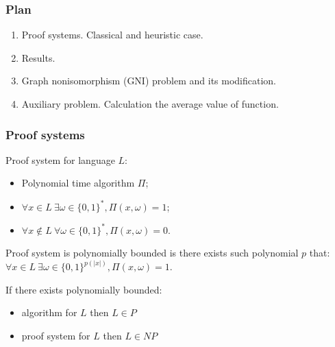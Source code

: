 \begin{frame}
    \frametitle{Plan}

    \begin{enumerate}
	    \item Proof systems. Classical and heuristic case.
    	\item Results.
    	\item Graph nonisomorphism (GNI) problem and its modification.
    	\item Auxiliary problem. Calculation the average value of function.
    \end{enumerate}
\end{frame}

\begin{frame}
	\frametitle{Proof systems}

    \begin{definition}
        Proof system for language $L$:
        \begin{itemize}
            \item Polynomial time algorithm $\Pi$;
            \item $\forall x \in L~ \exists \omega \in \{0, 1\}^{*}, \Pi(x, \omega) = 1$;
        	\item $\forall x \notin L~ \forall \omega \in \{0, 1\}^{*}, 
        		\Pi(x, \omega) = 0$.
        \end{itemize}
    \end{definition}

    \pause
    Proof system is polynomially bounded is there exists such polynomial $p$ that:
    $\forall x \in L~ \exists \omega \in \{0, 1\}^{p(|x|)}, \Pi(x, \omega) = 1$.


    \pause
    If there exists polynomially bounded:
    \begin{itemize}
        \item algorithm for $L$ then $L \in P$
	    \item proof system for $L$ then $L \in NP$
    \end{itemize}

\end{frame}

